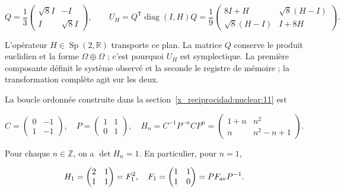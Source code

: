 \begin{equation}
Q=\frac13\begin{pmatrix}\sqrt8 I&-I\\I&\sqrt8 I\end{pmatrix},\qquad
U_H=Q^{\mathsf T}\operatorname{diag}(I,H)Q
=\frac19\begin{pmatrix}8I+H&\sqrt8(H-I)\\
\sqrt8(H-I)&I+8H\end{pmatrix}.
\label{x_reciprocidad:nuc12:eq:5.1}
\end{equation}



L’opérateur \(H\in\operatorname{Sp}(2,\mathbb R)\) transporte ce plan. La matrice \(Q\) conserve le produit euclidien et la forme \(\Omega\oplus\Omega\) ; c’est pourquoi \(U_H\) est symplectique. La première composante définit le système observé et la seconde le registre de mémoire ; la transformation complète agit sur les deux.

La boucle ordonnée construite dans la section~\ref{x_reciprocidad:nuclear:11} est



\begin{equation}
C=\begin{pmatrix}0&-1\\1&-1\end{pmatrix},\quad
P=\begin{pmatrix}1&1\\0&1\end{pmatrix},\quad
H_n=C^{-1}P^{-n}CP^n
=\begin{pmatrix}1+n&n^2\\n&n^2-n+1\end{pmatrix}.
\label{x_reciprocidad:nuc12:eq:5.2}
\end{equation}



Pour chaque \(n\in\mathbb Z\), on a \(\det H_n=1\). En particulier, pour \(n=1\),


\begin{equation}
H_1=\begin{pmatrix}2&1\\1&1\end{pmatrix}
=F_1^2,\quad F_1=\begin{pmatrix}1&1\\1&0\end{pmatrix}
=P F_{\rm av}P^{-1}.
\label{x_reciprocidad:nuc12:eq:5.3}
\end{equation}



